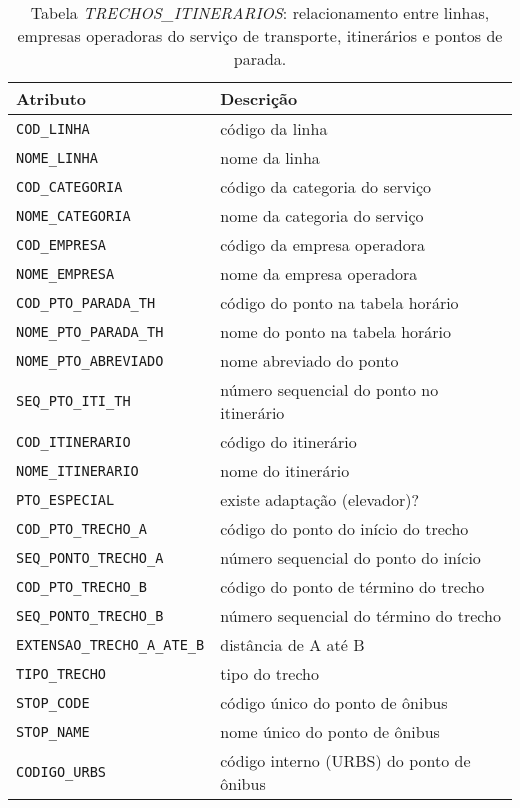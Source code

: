 \begin{table}[h]
    \caption{Tabela \emph{TRECHOS\_ITINERARIOS}: relacionamento entre linhas, empresas operadoras do serviço de transporte, itinerários e pontos de parada.}
    \centering
    \begin{tabular}{ p{5.2cm}p{8.8cm} } 
        \hline
        Atributo & Descrição\\
        \hline
        \texttt{COD\_LINHA} & código da linha  \\
        \texttt{NOME\_LINHA} & nome da linha  \\
        \texttt{COD\_CATEGORIA} & código da categoria do serviço \\
        \texttt{NOME\_CATEGORIA} &  nome da categoria do serviço \\
        \texttt{COD\_EMPRESA} & código da empresa operadora \\
        \texttt{NOME\_EMPRESA} & nome da empresa operadora \\
        \texttt{COD\_PTO\_PARADA\_TH} & código do ponto na tabela horário \\
        \texttt{NOME\_PTO\_PARADA\_TH} & nome do ponto na tabela horário \\
        \texttt{NOME\_PTO\_ABREVIADO} & nome abreviado do ponto \\
        \texttt{SEQ\_PTO\_ITI\_TH} & número sequencial do ponto no itinerário \\
        \texttt{COD\_ITINERARIO} & código do itinerário \\
        \texttt{NOME\_ITINERARIO} &  nome do itinerário \\
        \texttt{PTO\_ESPECIAL} & existe adaptação (elevador)? \\
        \texttt{COD\_PTO\_TRECHO\_A} &   código do ponto do início do trecho \\
        \texttt{SEQ\_PONTO\_TRECHO\_A} &  número sequencial do ponto do início \\
        \texttt{COD\_PTO\_TRECHO\_B} & código do ponto de término do trecho \\
        \texttt{SEQ\_PONTO\_TRECHO\_B} & número sequencial do término do trecho \\
        \texttt{EXTENSAO\_TRECHO\_A\_ATE\_B} &  distância de A até B \\
        \texttt{TIPO\_TRECHO} & tipo do trecho \\
        \texttt{STOP\_CODE} & código único do ponto de ônibus \\
        \texttt{STOP\_NAME} & nome único do ponto de ônibus \\
        \texttt{CODIGO\_URBS} & código interno (URBS) do ponto de ônibus \\
        \hline  
    \end{tabular}
    \label{tab:trechos_itinerarios}
\end{table}


